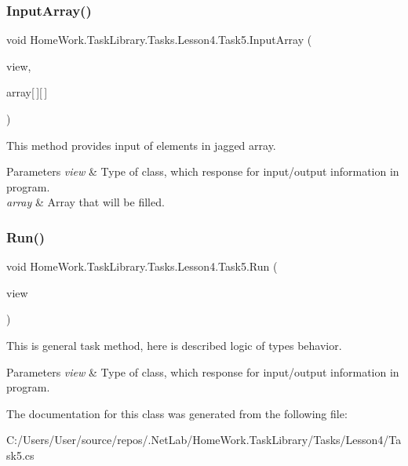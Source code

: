 \subsubsection{\texorpdfstring{InputArray()}{InputArray()}}
{\footnotesize\ttfamily void Home\+Work.\+Task\+Library.\+Tasks.\+Lesson4.\+Task5.\+Input\+Array (\begin{DoxyParamCaption}\item[{I\+Information}]{view,  }\item[{ref int}]{array\mbox{[}$\,$\mbox{]}\mbox{[}$\,$\mbox{]} }\end{DoxyParamCaption})\hspace{0.3cm}{\ttfamily [private]}}



This method provides input of elements in jagged array. 


\begin{DoxyParams}{Parameters}
{\em view} & Type of class, which response for input/output information in program.\\
\hline
{\em array} & Array that will be filled.\\
\hline
\end{DoxyParams}
\mbox{\label{class_home_work_1_1_task_library_1_1_tasks_1_1_lesson4_1_1_task5_a63d54a5d4b54aa37ce77d77dbd8c0062}} 
\subsubsection{\texorpdfstring{Run()}{Run()}}
{\footnotesize\ttfamily void Home\+Work.\+Task\+Library.\+Tasks.\+Lesson4.\+Task5.\+Run (\begin{DoxyParamCaption}\item[{I\+Information}]{view }\end{DoxyParamCaption})}



This is general task method, here is described logic of types behavior. 


\begin{DoxyParams}{Parameters}
{\em view} & Type of class, which response for input/output information in program.\\
\hline
\end{DoxyParams}


The documentation for this class was generated from the following file\+:\begin{DoxyCompactItemize}
\item 
C\+:/\+Users/\+User/source/repos/.\+Net\+Lab/\+Home\+Work.\+Task\+Library/\+Tasks/\+Lesson4/Task5.\+cs\end{DoxyCompactItemize}
